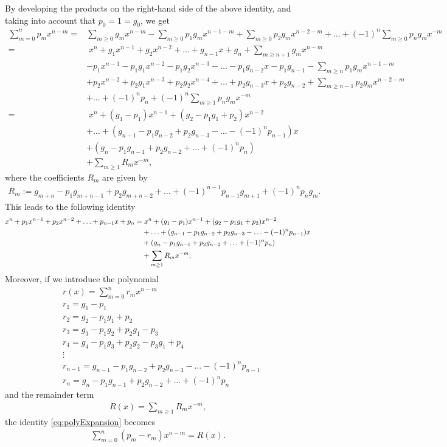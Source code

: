 \documentclass[a4paper]{article}
\numberwithin{equation}{section}
\begin{document}
{By developing the products on the right-hand side of the above identity, and taking into account that $p_0=1=g_0$, we get 
\begin{align*}
	\sum_{m=0}^n p_mx^{n-m} =& \sum_{m\geq 0} g_m x^{n-m} - \sum_{m\geq 0} p_1g_m x^{n-1-m} + \sum_{m\geq 0} p_2g_m x^{n-2-m} + \ldots + (-1)^n \sum_{m\geq 0} p_ng_m x^{-m} 
	\\
	=&\; x^n + g_1x^{n-1} + g_2x^{n-2} + \ldots + g_{n-1}x + g_n + \sum_{m\geq n+1} g_m x^{n-m} 
	\\
	&- p_1x^{n-1} - p_1g_1x^{n-2} - p_1g_2x^{n-3} - \ldots - p_1g_{n-2}x - p_1g_{n-1} - \sum_{m\geq n} p_1g_m x^{n-1-m} 
	\\
	&+ p_2x^{n-2} + p_2g_1x^{n-3} + p_2g_2x^{n-4} + \ldots + p_2g_{n-3}x + p_2g_{n-2} + \sum_{m\geq n-1} p_2g_m x^{n-2-m} 
	\\
	&+ \ldots +(-1)^n p_n +(-1)^n\sum_{m\geq 1} p_ng_m x^{-m} 
	\\
	=&\; x^n + (g_1-p_1)x^{n-1} + (g_2-p_1g_1+p_2)x^{n-2} 
	\\
	&+ \ldots + (g_{n-1}-p_1g_{n-2}+p_2g_{n-3}-\ldots-(-1)^np_{n-1})x 
	\\
	& + (g_n-p_1g_{n-1}+p_2g_{n-2}+\ldots+(-1)^np_n) 
	\\
	&+ \sum_{m\geq 1} R_m x^{-m},
\end{align*}
where the coefficients $R_m$ are given by
\begin{align*}
	R_m:= g_{m+n}-p_1g_{m+n-1}+p_2g_{m+n-2} + \ldots + (-1)^{n-1}p_{n-1}g_{m+1} + (-1)^np_ng_m.
\end{align*}
This leads to the following identity
\begin{align}\label{eq:polyExpansion}
	x^n + p_1x^{n-1} + p_2x^{n-2} + \ldots + p_{n-1}x + p_n = &\; x^n + (g_1-p_1)x^{n-1} + (g_2-p_1g_1+p_2)x^{n-2} \notag
	\\
	&+ \ldots + (g_{n-1}-p_1g_{n-2}+p_2g_{n-3}-\ldots-(-1)^np_{n-1})x \notag
	\\
	& + (g_n-p_1g_{n-1}+p_2g_{n-2}+\ldots+(-1)^np_n) \notag
	\\
	&+ \sum_{m\geq 1} R_m x^{-m}, 
\end{align}
Moreover, if we introduce the polynomial 
\begin{align*}
	&r(x) = \sum_{m=0}^n r_mx^{n-m}
	\\
	&r_1 = g_1-p_1
	\\
	&r_2 = g_2-p_1g_1+p_2
	\\
	&r_3 = g_3-p_1g_2+p_2g_1-p_3 
	\\
	&r_4 = g_4-p_1g_3+p_2g_2-p_3g_1+p_4
	\\
	&\vdots
	\\
	&r_{n-1} = g_{n-1}-p_1g_{n-2}+p_2g_{n-3}-\ldots-(-1)^np_{n-1}
	\\
	&r_n = g_n-p_1g_{n-1}+p_2g_{n-2}+\ldots+(-1)^np_n
\end{align*}
and the remainder term
\begin{align*}
	R(x) = \sum_{m\geq 1} R_m x^{-m},
\end{align*}
the identity \eqref{eq:polyExpansion} becomes
\begin{align}\label{eq:polyExpansionCompact}
	\sum_{m=0}^n (p_m-r_m)x^{n-m} = R(x).
\end{align}

}
\end{document}
